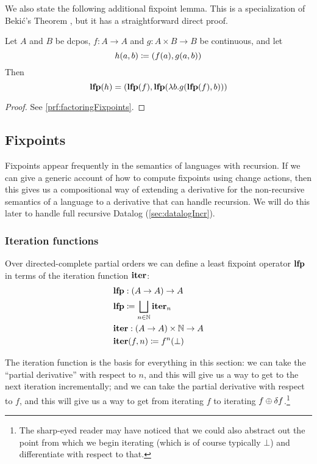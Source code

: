 We also state the following additional fixpoint lemma. This is a specialization of
Beki\'c's Theorem \autocite[][section 10.1]{winskel1993formal}, but it has a straightforward direct proof.

\begin{prop}[name=Factoring of fixpoints, restate=factoringFixpoints]
  \label{prop:factoringFixpoints}
  Let $A$ and $B$ be dcpos, $f : A \rightarrow A$ and $g: A \times B \rightarrow B$ be continuous, and let
  \begin{displaymath}
    h(a, b) \coloneqq (f(a), g(a, b))
  \end{displaymath}
  Then
  \begin{displaymath}
    \mathbf{lfp}(h) = (\mathbf{lfp}(f), \mathbf{lfp}(\lambda b . g(\mathbf{lfp}(f), b)))
  \end{displaymath}
\end{prop}
\ifproofs
\begin{proof}
  See \cref{prf:factoringFixpoints}.
\end{proof}
\fi

\subsection{Fixpoints}
\label{sec:fixpoints}

Fixpoints appear frequently in the semantics of languages with recursion. If we
can give a generic account of how to compute fixpoints using change actions,
then this gives us a compositional way of extending a derivative for the
non-recursive semantics of a language to a derivative that can handle recursion.
We will do this later to handle full recursive Datalog (\cref{sec:datalogIncr}).

\subsubsection{Iteration functions}
\label{sec:iteration}

Over directed-complete partial orders we can define a least fixpoint operator $\mathbf{lfp}$ in terms of the
iteration function $\mathbf{iter}$:
\begin{align*}
  &\mathbf{lfp} : (A \rightarrow A) \rightarrow A\\
  &\mathbf{lfp} \coloneqq \bigsqcup_{n \in \mathbb{N}} \mathbf{iter}_n \\
  &\mathbf{iter} : (A \rightarrow A) \times \mathbb{N} \rightarrow A\\
  &\mathbf{iter}(f, n) \coloneqq f^n(\bot)
\end{align*}

The iteration function is the basis for everything in this section:
we can take the ``partial derivative'' with respect to $n$, and this will give us a way to get
to the next iteration incrementally; and we can take the partial derivative
with respect to $f$, and this will give us a way to get from iterating $f$ to iterating $f
\oplus \delta f$.\footnote{The sharp-eyed reader may have noticed that we
  could also abstract out the point from which we begin iterating (which is of
  course typically $\bot$) and differentiate with respect to that.}

